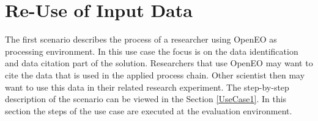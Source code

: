 \documentclass[draft,final]{vutinfth} %
\begin{document}



\section{Re-Use of Input Data}\label{Evaluation:Use Cases}\label{Evaluation:Use Case1}
The first scenario describes the process of a researcher using OpenEO as processing environment. In this use case the focus is on the data identification and data citation part of the solution. Researchers that use OpenEO may want to cite the data that is used in the applied process chain. Other scientist then may want to use this data in their related research experiment. The step-by-step description of the scenario can be viewed in the Section \ref{UseCase1}. In this section the steps of the use case are executed at the evaluation environment.
\end{document}
